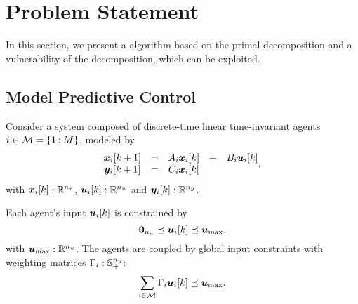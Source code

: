 \documentclass{ifacconf}  %
\begin{document}
\section{Problem Statement}\label{sec:PS}
In this section, we present a \dmpc{} algorithm based on the primal decomposition \citep{BoydEtAl2015} and a vulnerability of the decomposition, which can be exploited.

\subsection{Model Predictive Control}\label{ssec:MPC}
Consider a system composed of discrete-time linear time-invariant agents ${i\in\mathcal{M}=\{1\mathbin{:}M\}}$, modeled by
\begin{equation}
\begin{matrix}
  \label{eq:systems}
\vec{x}_{i}[k+1]&=&A_{i}\xik &+& B_{i}\uik\\
\vec{y}_{i}[k+1]&=&C_{i}\xik &&
\end{matrix},
\end{equation}
with $\boldsymbol{x}_{i}[k]:\mathbb{R}^{n_{x}}$, $\boldsymbol{u}_{i}[k]:\mathbb{R}^{n_{u}}$ and $\boldsymbol{y}_{i}[k]:\mathbb{R}^{n_{y}}$.

Each agent's input $\uik$ is constrained by
\begin{equation}
  \label{eq:u_local_constraints}
  \0_{n_{u}}\preceq\uik\preceq\vec{u}_{\max},
\end{equation}
with ${\boldsymbol{u}_{\mathrm{\max}}:\mathbb{R}^{n_{u}}}$.
The agents are coupled by global input constraints with weighting matrices ${\Gamma_{i}:\mathbb{S}_{+}^{n_{u}}}$:
\begin{equation}
  \label{eq:global_constraint}
  \sum_{i\in\set{M}}\Gamma_{i}\uik\preceq\umax.
\end{equation}
\end{document}
